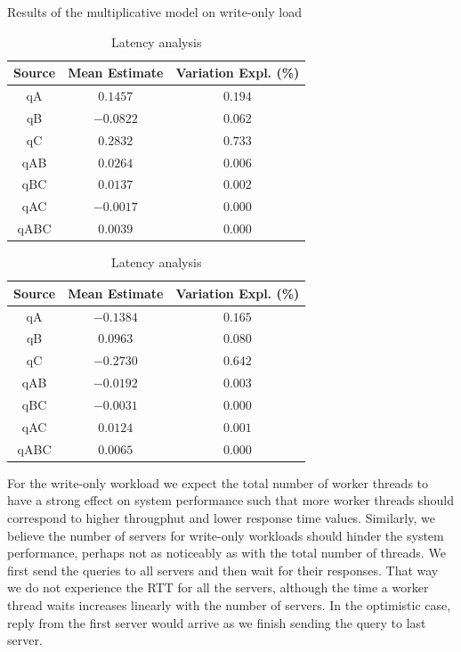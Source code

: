\documentclass[11pt,a4paper]{article}
\begin{document}
\begin{table}[h]
\centering
{Results of the multiplicative model on write-only load}
\begin{minipage}{.5\textwidth}
\centering
	\begin{tabular}{|c|c|c|}
	\hline 
	{\small Source} & {\small Mean Estimate} & {\small Variation Expl. (\%)} \\ 
	\hline 
	qA & $0.1457$ & $0.194$ \\ 
	\hline 
	qB & $-0.0822$ & $0.062$ \\ 
	\hline 
	qC & $0.2832$ & $0.733$ \\ 
	\hline 
	qAB & $0.0264$ & $0.006$ \\ 
	\hline 
	qBC & $0.0137$ & $0.002$ \\ 
	\hline 
	qAC & $-0.0017$ & $0.000$ \\ 
	\hline 
	qABC & $0.0039$ & $0.000$ \\ 
	\hline 
	\end{tabular} \caption{Throughput analysis} \label{tab:2k-mult-wo-tpt}
\end{minipage}%
\begin{minipage}{.5\textwidth}
\centering
	\begin{tabular}{|c|c|c|}
	\hline 
	{\small Source} & {\small Mean Estimate} & {\small Variation Expl. (\%)} \\ 
	\hline 
	qA & $-0.1384$ & $0.165$ \\ 
	\hline 
	qB & $0.0963$ & $0.080$ \\ 
	\hline 
	qC & $-0.2730$ & $0.642$ \\ 
	\hline 
	qAB & $-0.0192$ & $0.003$ \\ 
	\hline 
	qBC & $-0.0031$ & $0.000$ \\ 
	\hline 
	qAC & $0.0124$ & $0.001$ \\ 
	\hline 
	qABC & $0.0065$ & $0.000$ \\ 
	\hline 
	\end{tabular} \caption{Latency analysis} \label{tab:2k-mult-wo-lat}
\end{minipage}
\end{table}\label{tab:2k-mult-wo}
\par For the write-only workload we expect the total number of worker threads to have a strong effect on system performance such that more worker threads should correspond to higher througphut and lower response time values. Similarly, we believe the number of servers for write-only workloads should hinder the system performance, perhaps not as noticeably as with the total number of threads. We first send the queries to all servers and then wait for their responses. That way we do not experience the RTT for all the servers, although the time a worker thread waits increases linearly with the number of servers. In the optimistic case, reply from the first server would arrive as we finish sending the query to last server.
\end{document}
